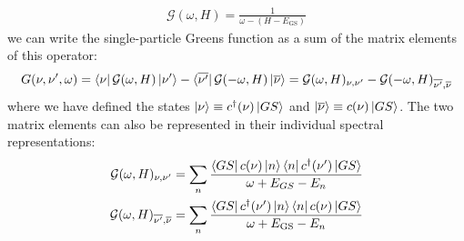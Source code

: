 \documentclass[reprint,hidelinks]{revtex4-2}
\begin{document}
\begin{widetext}
\begin{equation}
\begin{aligned}
	 \label{inv_G_func}
	 \mathcal{G}(\omega, H) = \frac{1}{\omega - (H - E_\text{GS})}
 \end{aligned}\end{equation}
 we can write the single-particle Greens function as a sum of the matrix elements of this operator:
 \begin{equation}\begin{aligned}
	 \label{G_mat_el}
	 G(\nu, \nu^\prime, \omega) = \bra{\nu} \mathcal{G}(\omega, H) \ket{\nu^\prime} - \bra{\overline{\nu^\prime}} \mathcal{G}(-\omega, H) \ket{\overline\nu} = \mathcal{G}(\omega, H)_{\nu,\nu^\prime} - \mathcal{G}(-\omega, H)_{\overline{\nu^\prime}, \overline\nu}
 \end{aligned}\end{equation}
 where we have defined the states $\ket{\nu} \equiv c^\dagger(\nu)\ket{GS}$ and $\ket{\overline\nu} \equiv c(\nu)\ket{GS}$. The two matrix elements can also be represented in their individual spectral representations:
 \begin{equation}\begin{aligned}
	 \label{G_mat_spec}
 	\mathcal{G}(\omega, H)_{\nu,\nu^\prime} = \sum_{n}\frac{\bra{GS}c(\nu)\ket{n}\bra{n}c^\dagger(\nu^\prime)\ket{GS}}{\omega + E_{GS} - E_n}\\
	\mathcal{G}(\omega, H)_{\overline{\nu^\prime}, \overline\nu} = \sum_{n}\frac{\bra{GS}c^\dagger(\nu^\prime)\ket{n}\bra{n}c(\nu)\ket{GS}}{\omega + E_\text{GS} - E_n}
 \end{aligned}\end{equation}
 

\end{widetext}
\end{document}
